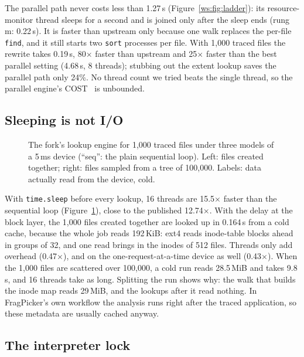 The parallel path never costs less than 1.27\,s (Figure~\ref{ws:fig:ladder}): its
resource-monitor thread sleeps for a second and is joined only after the sleep ends
(rung m: 0.22\,s). It is faster than upstream only because one walk replaces the
per-file \texttt{find}, and it still starts two \texttt{sort} processes per file. With 1{,}000
traced files the rewrite takes 0.19\,s, 80$\times$ faster than upstream and 25$\times$
faster than the best parallel setting (4.68\,s, 8 threads); stubbing out the extent
lookup saves the parallel path only 24\%. No thread count we tried beats the single
thread, so the parallel engine's COST~\cite{mcsherry2015cost} is unbounded.

\subsection{Sleeping is not I/O}
\label{ws:models}

\begin{figure}[t]
\centering
{}
\caption{The fork's lookup engine for 1{,}000 traced files under three models of a 5\,ms
device (``seq'': the plain sequential loop). Left: files created together; right: files
sampled from a tree of 100{,}000. Labels: data actually read from the device, cold.}
\label{ws:fig:models}
\end{figure}

With \texttt{time.sleep} before every lookup, 16 threads are 15.5$\times$ faster than
the sequential loop (Figure~\ref{ws:fig:models}), close to the published 12.74$\times$.
With the delay at the block layer, the 1{,}000 files created together are looked up in
0.164\,s from a cold cache, because the whole job reads 192\,KiB: ext4 reads inode-table
blocks ahead in groups of 32, and one read brings in the inodes of 512 files. Threads
only add overhead (0.47$\times$), and on the one-request-at-a-time device as well
(0.43$\times$). When the 1{,}000 files are scattered over 100{,}000, a cold run reads
28.5\,MiB and takes 9.8\,s, and 16 threads take as long. Splitting the run shows why:
the walk that builds the inode map reads 29\,MiB, and the lookups after it read nothing.
In FragPicker's own workflow the analysis runs right after the traced application, so
these metadata are usually cached anyway.

\subsection{The interpreter lock}
\label{ws:gil}

